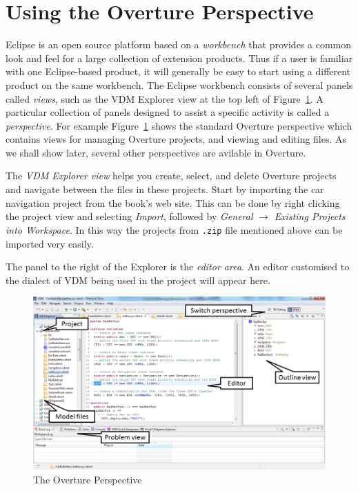 \section{Using the Overture Perspective}\label{sec:vdmsupport}

Eclipse is an open source platform based on a \emph{workbench} that
provides a common look and feel for a large collection of extension
products. Thus if a user is familiar with one Eclipse-based product,
it will generally be easy to start using a different product on the
same workbench. The Eclipse workbench consists of several panels
called \emph{views}, such as the VDM Explorer view at the top left
of Figure~\ref{fig:userguide:OverturePerspective}. A particular
collection of panels designed to assist a specific activity is called a
\emph{perspective}. For example
Figure~\ref{fig:userguide:OverturePerspective} shows the standard
Overture perspective which contains views for managing Overture
projects, and viewing and editing files. As we shall show later,
several other perspectives are avilable in Overture.

The \emph{VDM Explorer view} helps you create, select, and delete
Overture projects and navigate between the files in these
projects. Start by importing the car navigation project from the
book's web site. This can be done by right clicking the project view
and selecting \emph{Import}, followed by \emph{General} $\rightarrow$
\emph{Existing Projects into Workspace}.  In this way the projects
from \texttt{.zip} file mentioned above can be imported very easily.

The panel to the right of the Explorer is the \emph{editor area}. An
editor customised to the dialect of VDM being used in the project will
appear here.

\begin{figure}[!htb]
\begin{center}
  \includegraphics[width=4.5in]{figures/OverturePerspectiveRT}
  \caption[labelInTOC]{The Overture Perspective}
  \label{fig:userguide:OverturePerspective}
\end{center}
\end{figure}

